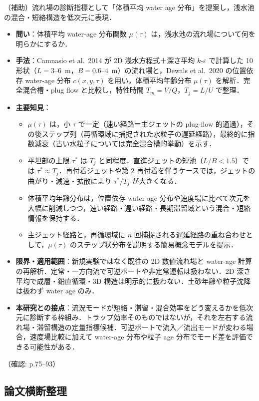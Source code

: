 \documentclass[11pt]{jsarticle}
\newcommand{\litref}[1]{{\large\bfseries\color{citecolor}#1}}
\begin{document}
\noindent\litref{Dewals et al. (2024)}\quad（補助）流れ場の診断指標として「体積平均 water age 分布」を提案し，浅水池の混合・短絡構造を低次元に表現．
\begin{itemize}
  \item \textbf{問い}：体積平均 water-age 分布関数 $\mu(\tau)$ は，浅水池の流れ場について何を明らかにするか．
  \item \textbf{手法}：Camnasio et al.\ 2014 が 2D 浅水方程式＋深さ平均 $k$-$\varepsilon$ で計算した 10 形状（$L = 3$--$6$~m，$B = 0.6$--$4$~m）の流れ場と，Dewals et al.\ 2020 の位置依存 water-age 分布 $c(x,y,\tau)$ を用い，体積平均年齢分布 $\mu(\tau)$ を解析．完全混合槽・plug flow と比較し，特性時間 $T_m = V/Q$，$T_j = L/U$ で整理．
  \item \textbf{主要知見}：
  \begin{itemize}
    \item $\mu(\tau)$ は，小 $\tau$ で一定（速い経路＝主ジェットの plug-flow 的通過），その後ステップ列（再循環域に捕捉された水粒子の遅延経路），最終的に指数減衰（古い水粒子については完全混合槽的挙動）を示す．
    \item 平坦部の上限 $\tau^*$ は $T_j$ と同程度．直進ジェットの短池（$L/B < 1.5$）では $\tau^* \approx T_j$．再付着ジェットや第 2 再付着を伴うケースでは，ジェットの曲がり・減速・拡散により $\tau^*/T_j$ が大きくなる．
    \item 体積平均年齢分布は，位置依存 water-age 分布や速度場に比べて次元を大幅に削減しつつ，速い経路・遅い経路・長期滞留域という混合・短絡情報を保持する．
    \item 主ジェット経路と，再循環域に $n$ 回捕捉される遅延経路の重ね合わせとして，$\mu(\tau)$ のステップ状分布を説明する簡易概念モデルを提示．
  \end{itemize}
  \item \textbf{限界・適用範囲}：新規実験ではなく既往の 2D 数値流れ場と water-age 計算の再解析．定常・一方向流で可逆ポートや非定常運転は扱わない．2D 深さ平均で成層・鉛直循環・3D 構造は明示的に扱わない．土砂年齢や粒子沈降は扱わず water age のみ．
  \item \textbf{本研究との接点}：流況モードが短絡・滞留・混合効率をどう変えるかを低次元に診断する枠組み．トラップ効率そのものではないが，それを左右する流れ場・滞留構造の定量指標候補．可逆ポートで流入／流出モードが変わる場合，速度場比較に加えて water-age 分布や粒子 age 分布でモード差を評価できる可能性がある．
\end{itemize}
\noindent（確認: p.75--93）

\subsection*{論文横断整理}
\end{document}
